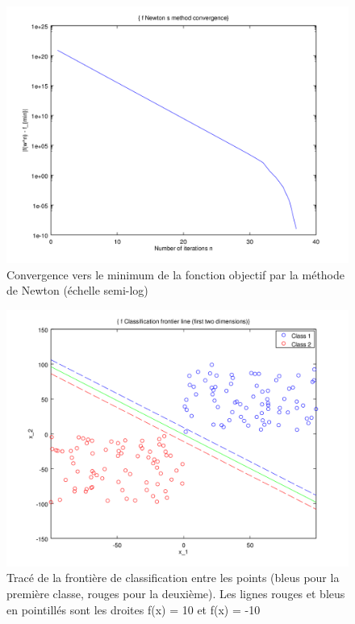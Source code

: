 \documentclass{article}
\begin{document}
         \begin{figure}
           \begin{center}
             \subfigure\includegraphics[scale=0.5]{images/cvnewton2.png}
             \caption{Convergence vers le minimum de la fonction objectif par la méthode de Newton (échelle semi-log)}
           \end{center}
         \end{figure}

         \begin{figure}
           \begin{center}
             \subfigure\includegraphics[scale=0.5]{images/line2.png}
             \caption{Tracé de la frontière de classification entre les points (bleus pour la première classe, rouges pour la deuxième). Les lignes rouges et bleus en pointillés sont les droites f(x) = 10 et f(x) = -10}
           \end{center}
         \end{figure}
\end{document}
